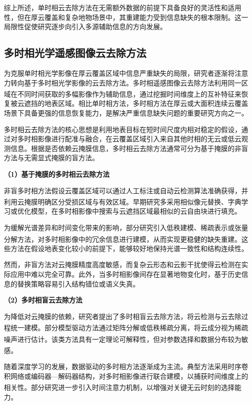 综上所述，单时相云去除方法在无需额外数据的前提下具备良好的灵活性和适用性，但在厚云覆盖和复杂地物场景中，其重建能力受到信息缺失的根本限制。这一局限性促使研究逐步向引入多源辅助信息的方向发展。

\subsection{多时相光学遥感图像云去除方法}

为克服单时相光学影像在厚云覆盖区域中信息严重缺失的局限，研究者逐渐将注意力转向基于多时相光学影像的云去除方法。多时相遥感图像云去除方法利用同一区域在不同时间获取的多幅影像作为辅助信息\textsuperscript{\cite{zou2023spectral}}，通过挖掘时间维度上的互补特征来恢复被云遮挡的地表区域。相比单时相方法，多时相方法在厚云或大面积连续云覆盖场景下具备更强的信息恢复能力，是解决严重信息缺失问题的重要研究方向之一。

多时相云去除方法的核心思想是利用地表目标在短时间尺度内相对稳定的假设，通过对多时相影像进行配准与融合，在云覆盖区域引入来自其他时相的无云或低云观测信息。根据是否依赖云掩膜信息，多时相云去除方法通常可分为基于掩膜的非盲方法与无需显式掩膜的盲方法。

\textbf{（1）基于掩膜的多时相云去除方法}

非盲多时相方法假设云覆盖区域可以通过人工标注或自动云检测算法准确获得，并利用云掩膜明确区分受损区域与有效区域\textsuperscript{\cite{lin2022robust}}。早期研究多采用相似像元替换、字典学习或优化模型，在多时相影像中搜索与云遮挡区域最相似的云自由块进行填充。

为缓解光谱差异和时间变化带来的影响，部分研究引入低秩建模、稀疏表示或张量分解方法，对多时相影像中的冗余信息进行建模，从而实现更稳健的缺失重建\textsuperscript{\cite{zhang2021thick,imran2022deep}}。这些方法在假设地表变化较小的前提下，能够较好地保持光谱一致性和结构连续性。

然而，非盲方法对云掩膜精度高度敏感，而复杂云形态和云影干扰使得云检测在实际应用中难以完全可靠。此外，当多时相影像间存在显著地物变化时，基于历史信息的替换策略容易引入结构错位或语义失真。

\textbf{（2）多时相盲云去除方法}

为降低对云掩膜的依赖，研究者提出了多时相盲云去除方法，将云检测与云去除过程统一建模\textsuperscript{\cite{lin2022robust}}。部分模型驱动方法通过矩阵分解或低秩稀疏分离，将云成分视为稀疏噪声进行估计\textsuperscript{\cite{xu2016cloud,li2019cloud}}。该类方法具有一定理论可解释性，但对参数选择和数据分布较为敏感\textsuperscript{\cite{ji2022unified}}。

随着深度学习的发展，数据驱动的多时相方法逐渐成为主流。典型方法采用时序卷积网络或编码器—解码器结构，对多时相影像进行联合建模，以捕获时间维度上的相关性\textsuperscript{\cite{zou2023pmaa}}。部分研究进一步引入时间注意力机制，以增强对关键无云时刻的选择能力。

